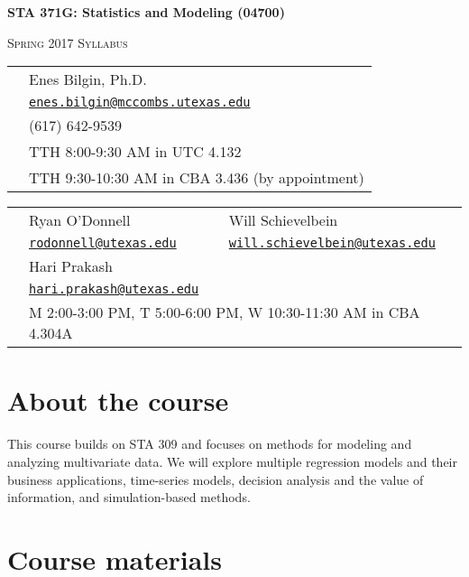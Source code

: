 \documentclass[12pt]{article}
\begin{document}
\pagestyle{fancy}
\thispagestyle{empty}

\begin{center}
\textbf{\Large STA 371G: Statistics and Modeling (04700)}

\textsc{\large Spring 2017 Syllabus}

\bigskip

\begin{tabular}{rl}
\noindent {\bf Instructor:} & Enes Bilgin, Ph.D. \\
\noindent {\bf Email:} & \href{mailto:enes.bilgin@mccombs.utexas.edu}{\tt enes.bilgin@mccombs.utexas.edu} \\
\noindent {\bf Phone:} & (617) 642-9539 \\
\noindent {\bf Class Meetings:} & TTH 8:00-9:30 AM in UTC 4.132 \\
\noindent {\bf Office Hours:} & TTH 9:30-10:30 AM in CBA 3.436 (by appointment)\\
\end{tabular}

\begin{tabular}{rll}
\noindent {\bf TA:} & Ryan O'Donnell & Will Schievelbein \\
\noindent {\bf Email:} & \href{mailto:rodonnell@utexas.edu}{\tt rodonnell@utexas.edu} & \href{mailto:will.schievelbein@utexas.edu}{\tt  will.schievelbein@utexas.edu} \\
\noindent {\bf TA:} & Hari Prakash \\
\noindent {\bf Email:} & \href{mailto:hari.prakash@utexas.edu}{\tt hari.prakash@utexas.edu} \\
\noindent {\bf Office Hours:} & \multicolumn{2}{l}{M 2:00-3:00 PM, T 5:00-6:00 PM, W 10:30-11:30 AM in CBA 4.304A}  \\
\end{tabular}

\end{center}

\section*{About the course}

This course builds on STA 309 and focuses on methods for modeling and analyzing multivariate data.  We will explore multiple regression models and their business applications, time-series models, decision analysis and the value of information, and simulation-based methods.

\section*{Course materials}
\end{document}
